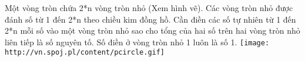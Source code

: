 Một vòng tròn chứa 2*n vòng tròn nhỏ (Xem hình vẽ). Các vòng tròn nhỏ được đánh số từ 1 đến 2*n theo chiều kim đồng hồ. Cần điền các số tự nhiên từ 1 đến 2*n mỗi số vào một vòng tròn nhỏ sao cho tổng của hai số trên hai vòng tròn nhỏ liên tiếp là số nguyên tố. Số điền ở vòng tròn nhỏ 1 luôn là số 1.  
\texttt{[image: http://vn.spoj.pl/content/pcircle.gif]}

\